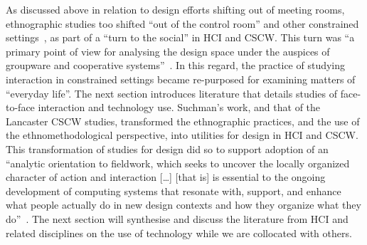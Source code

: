 \begin{revisedsubmission}
As discussed above in relation to design efforts shifting out of meeting rooms, ethnographic studies too shifted ``out of the control room'' and other constrained settings~\citep{Hughes1994}, as part of a ``turn to the social'' in \ac{HCI} and \ac{CSCW}.
This turn was ``a primary point of view for analysing the design space under the auspices of groupware and cooperative systems''~\citep[p. 28]{Crabtree2003a}.
In this regard, the practice of studying interaction in constrained settings became re-purposed for examining matters of ``everyday life''.
The next section introduces literature that details studies of face-to-face interaction and technology use.
Suchman's work, and that of the Lancaster \ac{CSCW} studies, transformed the ethnographic practices, and the use of the ethnomethodological perspective, into utilities for design in \ac{HCI} and \ac{CSCW}.
This transformation of studies for design did so to support adoption of an ``analytic orientation to fieldwork, which seeks to uncover the locally organized character of action and interaction [\ldots] [that is] is essential to the ongoing development of computing systems that resonate with, support, and enhance what people actually do in new design contexts and how they organize what they do''~\citep[p. 881]{Crabtree2009}.
The next section will synthesise and discuss the literature from \ac{HCI} and related disciplines on the use of technology while we are collocated with others.
\end{revisedsubmission}






